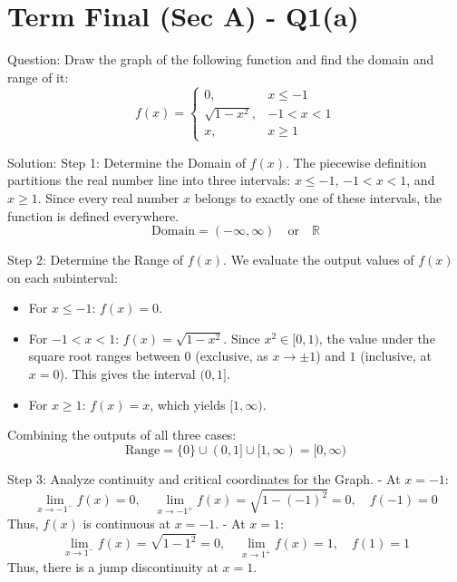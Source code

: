\documentclass{article}
\begin{document}
\section*{Term Final (Sec A) - Q1(a)}
Question:
Draw the graph of the following function and find the domain and range of it:
\[
f(x) = \begin{cases}
0, & x \le -1 \\
\sqrt{1-x^2}, & -1 < x < 1 \\
x, & x \ge 1
\end{cases}
\]

Solution:
Step 1: Determine the Domain of $f(x)$.
The piecewise definition partitions the real number line into three intervals: $x \le -1$, $-1 < x < 1$, and $x \ge 1$. Since every real number $x$ belongs to exactly one of these intervals, the function is defined everywhere.
\[
\text{Domain} = (-\infty, \infty) \quad \text{or} \quad \mathbb{R}
\]

Step 2: Determine the Range of $f(x)$.
We evaluate the output values of $f(x)$ on each subinterval:
\begin{itemize}
    \item For $x \le -1$: $f(x) = 0$.
    \item For $-1 < x < 1$: $f(x) = \sqrt{1-x^2}$. Since $x^2 \in [0, 1)$, the value under the square root ranges between $0$ (exclusive, as $x \to \pm 1$) and $1$ (inclusive, at $x = 0$). This gives the interval $(0, 1]$.
    \item For $x \ge 1$: $f(x) = x$, which yields $[1, \infty)$.
\end{itemize}
Combining the outputs of all three cases:
\[
\text{Range} = \{0\} \cup (0, 1] \cup [1, \infty) = [0, \infty)
\]

Step 3: Analyze continuity and critical coordinates for the Graph.
- At $x = -1$: 
  \[
  \lim_{x \to -1^-} f(x) = 0, \quad \lim_{x \to -1^+} f(x) = \sqrt{1 - (-1)^2} = 0, \quad f(-1) = 0
  \]
  Thus, $f(x)$ is continuous at $x = -1$.
- At $x = 1$:
  \[
  \lim_{x \to 1^-} f(x) = \sqrt{1 - 1^2} = 0, \quad \lim_{x \to 1^+} f(x) = 1, \quad f(1) = 1
  \]
  Thus, there is a jump discontinuity at $x = 1$.
\end{document}
